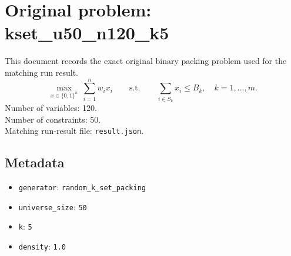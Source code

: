 \documentclass[11pt]{article}
\begin{document}
\section*{Original problem: kset\_u50\_n120\_k5}
This document records the exact original binary packing problem used for the matching run result.
\[
\max_{x\in\{0,1\}^n}\ \sum_{i=1}^n w_i x_i
\qquad\text{s.t.}\qquad
\sum_{i\in S_k} x_i \le B_k,\quad k=1,\dots,m.
\]
Number of variables: 120.\\
Number of constraints: 50.\\
Matching run-result file: \texttt{result.json}.
\subsection*{Metadata}
\begin{itemize}
\item \texttt{generator}: \texttt{random\_k\_set\_packing}
\item \texttt{universe\_size}: \texttt{50}
\item \texttt{k}: \texttt{5}
\item \texttt{density}: \texttt{1.0}
\end{itemize}
\end{document}

